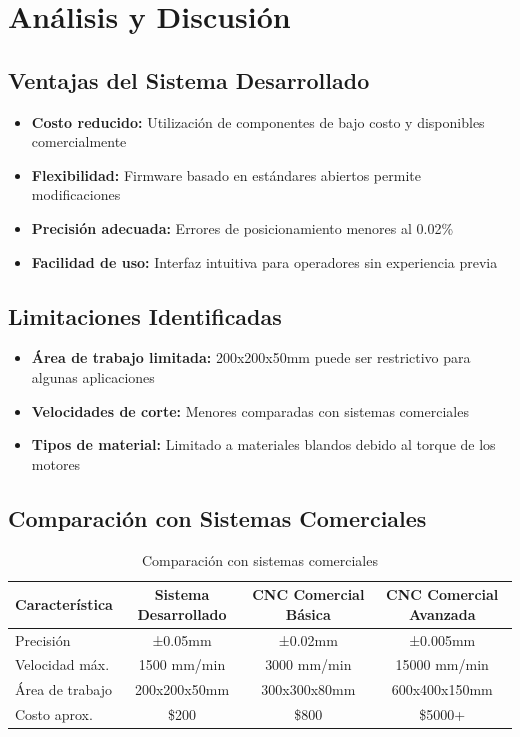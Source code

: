 \documentclass[12pt]{article}
\begin{document}
\section{Análisis y Discusión}

\subsection{Ventajas del Sistema Desarrollado}

\begin{itemize}
    \item \textbf{Costo reducido:} Utilización de componentes de bajo costo y disponibles comercialmente
    \item \textbf{Flexibilidad:} Firmware basado en estándares abiertos permite modificaciones
    \item \textbf{Precisión adecuada:} Errores de posicionamiento menores al 0.02\%
    \item \textbf{Facilidad de uso:} Interfaz intuitiva para operadores sin experiencia previa
\end{itemize}

\subsection{Limitaciones Identificadas}

\begin{itemize}
    \item \textbf{Área de trabajo limitada:} 200x200x50mm puede ser restrictivo para algunas aplicaciones
    \item \textbf{Velocidades de corte:} Menores comparadas con sistemas comerciales
    \item \textbf{Tipos de material:} Limitado a materiales blandos debido al torque de los motores
\end{itemize}

\subsection{Comparación con Sistemas Comerciales}

\begin{table}[H]
\centering
\caption{Comparación con sistemas comerciales}
\label{tab:comparacion}
\begin{tabular}{|l|c|c|c|}
\hline
\textbf{Característica} & \textbf{Sistema Desarrollado} & \textbf{CNC Comercial Básica} & \textbf{CNC Comercial Avanzada} \\
\hline
Precisión & ±0.05mm & ±0.02mm & ±0.005mm \\
Velocidad máx. & 1500 mm/min & 3000 mm/min & 15000 mm/min \\
Área de trabajo & 200x200x50mm & 300x300x80mm & 600x400x150mm \\
Costo aprox. & \$200 & \$800 & \$5000+ \\
\hline
\end{tabular}
\end{table}
\end{document}
